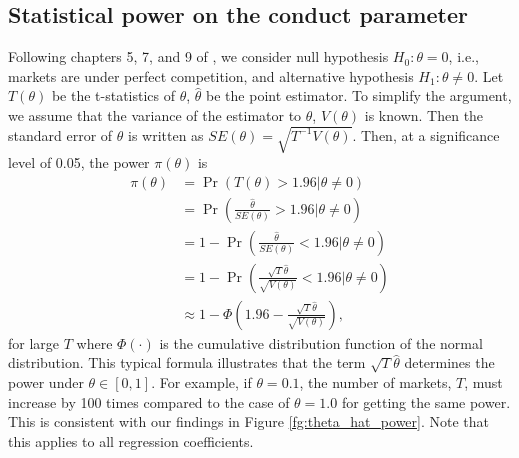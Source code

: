 \documentclass[11pt, a4paper]{article}
\begin{document}
\subsection{Statistical power on the conduct parameter}
Following chapters 5, 7, and 9 of \cite{hansen2022econometrics}, we consider null hypothesis $H_{0}:\theta=0$, i.e., markets are under perfect competition, and alternative hypothesis $H_{1}:\theta\neq 0$. 
Let $T(\theta)$ be the t-statistics of $\theta$, $\hat{\theta}$ be the point estimator.
To simplify the argument, we assume that the variance of the estimator to $\theta$, $V(\theta)$ is known.
Then the standard error of $\theta$ is written as $SE(\theta)=\sqrt{T^{-1}V(\theta)}$.
Then, at a significance level of 0.05, the power $\pi(\theta)$ is
\begin{align*}
    \pi(\theta) &= \Pr(T(\theta)>1.96|\theta\neq 0)\\
    &=\Pr\left(\frac{\hat{\theta}}{SE(\theta)}>1.96|\theta\neq 0\right)\\
    &=1 - \Pr\left(\frac{\hat{\theta}}{SE(\theta)}<1.96|\theta\neq 0\right)\\
    &=1 - \Pr\left(\frac{\sqrt{T}\hat{\theta}}{\sqrt{V(\theta)}}<1.96|\theta\neq 0\right)\\
    &\approx 1 - \Phi\left(1.96 - \frac{\sqrt{T}\hat{\theta}}{\sqrt{V(\theta)}}\right),
\end{align*}
for large $T$ where $\Phi(\cdot)$ is the cumulative distribution function of the normal distribution.
This typical formula illustrates that the term $\sqrt{T}\hat{\theta}$ determines the power  under $\theta\in[0,1]$. For example, if $\theta=0.1$, the number of markets, $T$, must increase by 100 times compared to the case of $\theta=1.0$ for getting the same power. This is consistent with our findings in Figure \ref{fg:theta_hat_power}. 
Note that this applies to all regression coefficients.
\end{document}
